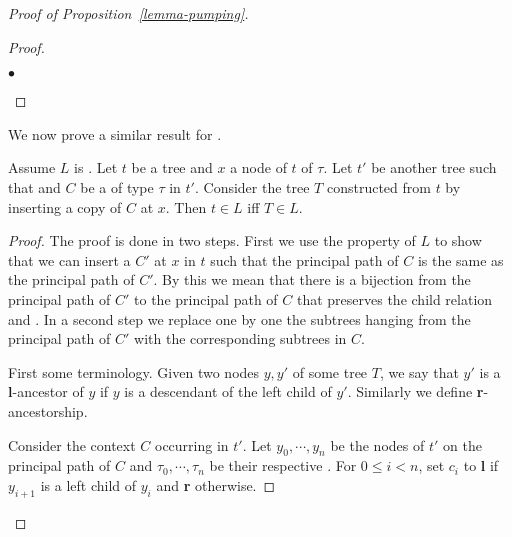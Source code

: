 \begin{proof}[Proof of Proposition~\ref{lemma-pumping}]
\begin{proof}
\begin{iteMize}{$\bullet$}
\begin{center}
\begin{tikzpicture}
\end{tikzpicture}
\end{center}
\end{iteMize}
\end{proof}

We now prove a similar result for \kloops.

\begin{lem}\label{lemma-insert-loop}
  Assume $L$ is \ktame. Let $t$ be a tree and $x$ a node of $t$ of \ktype
  $\tau$. Let $t'$ be another tree such that  and $C$ be
  a \kloop of type $\tau$ in $t'$. Consider the tree $T$ constructed from $t$
  by inserting a copy of $C$ at $x$. Then $t \in L$ iff $T \in L$.
\end{lem}

\begin{proof} 

The proof is done in two steps. First we use the \ktame property
  of $L$ to show that we can insert a \kloop $C'$ at $x$ in $t$ such that the
  principal path of $C$ is the same as the principal path of $C'$. By this we
  mean that there is a bijection from the principal path of $C'$ to the
  principal path of $C$ that preserves the child relation and .  In a second step we
  replace one by one the subtrees hanging from the principal path of $C'$ with
  the corresponding subtrees in $C$.

  First some terminology. Given two nodes $y,y'$ of some tree $T$, we say that
  $y'$ is a {\bf l}-ancestor of $y$ if $y$ is a descendant of the left child of
  $y'$. Similarly we define {\bf r}-ancestorship.

  Consider the context $C$ occurring in $t'$. Let $y_{0}, \cdots,y_{n}$ be the
  nodes of $t'$ on the principal path of $C$ and $\tau_{0}, \cdots,\tau_{n}$ be
  their respective . For $0 \leq i < n$, set $c_i$ to {\bf l}
  if $y_{i+1}$ is a left child of $y_i$ and {\bf r} otherwise.


\end{proof}
\end{proof}
